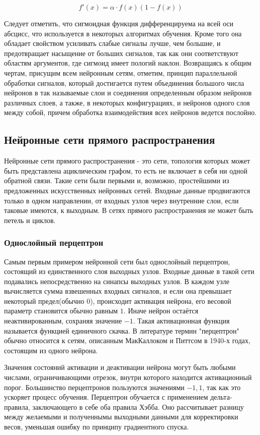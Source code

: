\documentclass[a4paper,12pt]{report}
\begin{document}
\begin{equation}
f'(x)=\alpha \cdot f(x)(1-f(x))
\end{equation}

Следует отметить, что сигмоидная функция дифференцируема на всей оси абсцисс, что используется в некоторых алгоритмах обучения. Кроме того она обладает свойством усиливать слабые сигналы лучше, чем большие, и предотвращает насыщение от больших сигналов, так как они соответствуют областям аргументов, где сигмоид имеет пологий наклон. Возвращаясь к общим чертам, присущим всем нейронным сетям, отметим, принцип параллельной обработки сигналов, который достигается путем объединения большого числа нейронов в так называемые слои и соединения определенным образом нейронов различных слоев, а также, в некоторых конфигурациях, и нейронов одного слоя между собой, причем обработка взаимодействия всех нейронов ведется послойно. 

\subsection{Нейронные сети прямого распространения}
Нейронные сети прямого распространения - это сети, топология которых может быть представлена ациклическим графом, то есть не включает в себя ни одной обратной связи. Такие сети были первыми и, возможно, простейшими из предложенных искусственных нейронных сетей. Входные данные продвигаются только в одном направлении, от входных узлов через внутренние слои, если таковые имеются, к выходным. В сетях прямого распространения не может быть петель и циклов.
\subsubsection{Однослойный перцептрон}
Самым первым примером нейронной сети был однослойный перцептрон, состоящий из единственного слоя выходных узлов. Входные данные в такой сети подавались непосредственно на синапсы выходных узлов. В каждом узле вычисляется сумма взвешенных входных сигналов, и если она превышает некоторый предел(обычно $0$), происходит активация нейрона, его весовой параметр становится обычно равным $1$. Иначе нейрон остаётся неактивированным, сохраняя значение $-1$. Такая активационная функция называется функцией единичного скачка. В литературе термин "перцептрон" обычно относится к сетям, описанным МакКаллоком и Питтсом в 1940-х годах, состоящим из одного нейрона.

Значения состояний активации и деактивации нейрона могут быть любыми числами, ограничивающими отрезок, внутри которого находится активационный порог. Большинство перцептронов пользуются значениями $-1,1$, так как это ускоряет процесс обучения. Перцептрон обучается с применением дельта-правила, заключающего в себе оба правила Хэбба. Оно рассчитывает разницу между желаемыми и полученнымы выходными данными для корректировки весов, уменьшая ошибку по принципу градиентного спуска.
\end{document}
